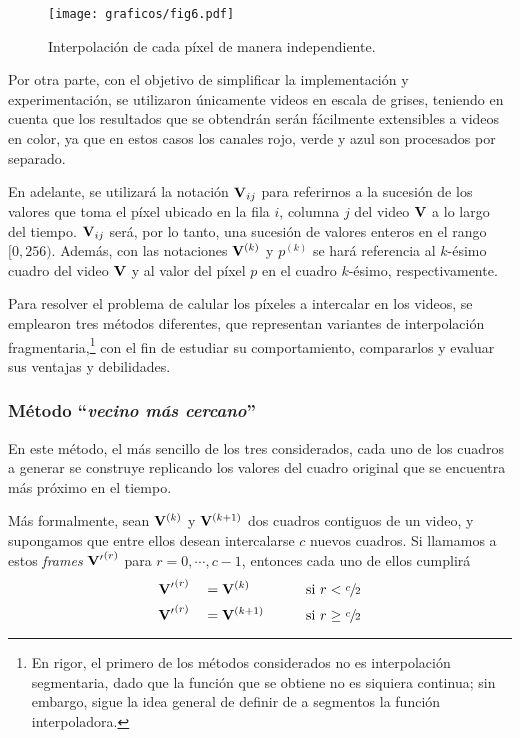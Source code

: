     \begin{figure}[h]
      \centering

      \texttt{[image: graficos/fig6.pdf]} \vspace{1em} \\

      \caption{Interpolación de cada píxel de manera independiente.}
      \label{fig:pixeles-indep}
    \end{figure}

    Por otra parte, con el objetivo de simplificar la implementación y experimentación, se utilizaron únicamente videos en escala de grises, teniendo en cuenta que los resultados que se obtendrán serán fácilmente extensibles a videos en color, ya que en estos casos los canales rojo, verde y azul son procesados por separado.

    En adelante, se utilizará la notación $\mathbf{V}_{ij}$ para referirnos a la sucesión de los valores que toma el píxel ubicado en la fila $i$, columna $j$ del video $\mathbf{V}$ a lo largo del tiempo. $\mathbf{V}_{ij}$ será, por lo tanto, una sucesión de valores enteros en el rango $[0, 256)$. Además, con las notaciones $\mathbf{V}^{(k)}$ y $p^{(k)}$ se hará referencia al $k$-ésimo cuadro del video $\mathbf{V}$ y al valor del píxel $p$ en el cuadro $k$-ésimo, respectivamente.

    Para resolver el problema de calular los píxeles a intercalar en los videos, se emplearon tres métodos diferentes, que representan variantes de interpolación fragmentaria,\footnote{En rigor, el primero de los métodos considerados no es interpolación segmentaria, dado que la función que se obtiene no es siquiera continua; sin embargo, sigue la idea general de definir de a segmentos la función interpoladora.} con el fin de estudiar su comportamiento, compararlos y evaluar sus ventajas y debilidades.

      \subsubsection{Método ``\emph{vecino más cercano}''}
        En este método, el más sencillo de los tres considerados, cada uno de los cuadros a generar se construye replicando los valores del cuadro original que se encuentra más próximo en el tiempo.

        Más formalmente, sean $\mathbf{V}^{(k)}$ y $\mathbf{V}^{(k+1)}$ dos cuadros contiguos de un video, y supongamos que entre ellos desean intercalarse $c$ nuevos cuadros. Si llamamos a estos \emph{frames} $\mathbf{V'}^{(r)}$ para $r = 0, \cdots, c - 1$, entonces cada uno de ellos cumplirá
        \begin{alignat*}{3}
          &\mathbf{V'}^{(r)} &&= \mathbf{V}^{(k)} && \qquad \text{si } r < \sfrac{c}{2} \\
          &\mathbf{V'}^{(r)} &&= \mathbf{V}^{(k+1)} && \qquad \text{si } r \geq \sfrac{c}{2}
        \end{alignat*}

